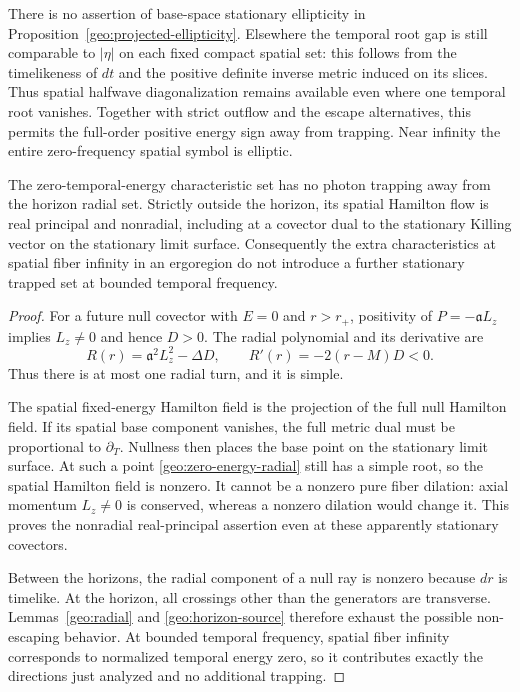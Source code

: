 There is no assertion of base-space stationary ellipticity in
Proposition~\ref{geo:projected-ellipticity}.  Elsewhere the temporal
root gap is still comparable to $|\eta|$ on each fixed compact
spatial set: this follows from the timelikeness of $dt$ and the
positive definite inverse metric induced on its slices.  Thus
spatial halfwave diagonalization remains available even where one
temporal root vanishes.  Together with strict outflow and the
escape alternatives, this permits the full-order positive energy
sign away from trapping.  Near infinity the entire zero-frequency
spatial symbol is elliptic.

\begin{lemma}
\label{geo:zero-energy}
The zero-temporal-energy characteristic set has no photon trapping
away from the horizon radial set.  Strictly outside the horizon,
its spatial Hamilton flow is real principal and nonradial,
including at a covector dual to the stationary Killing vector on
the stationary limit surface.  Consequently the extra
characteristics at spatial fiber infinity in an ergoregion do not
introduce a further stationary trapped set at bounded temporal
frequency.
\end{lemma}

\begin{proof}
For a future null covector with $E=0$ and $r>r_+$, positivity
of $P=-\mathfrak a L_z$ implies $L_z\neq0$ and hence $D>0$.
The radial polynomial and its derivative are
\begin{equation}
 R(r)=\mathfrak a^2L_z^2-\Delta D,\qquad
 R'(r)=-2(r-M)D<0.
 \label{geo:zero-energy-radial}
\end{equation}
Thus there is at most one radial turn, and it is simple.

The spatial fixed-energy Hamilton field is the projection of the
full null Hamilton field.  If its spatial base component vanishes,
the full metric dual must be proportional to $\partial_T$.
Nullness then places the base point on the stationary limit
surface.  At such a point \eqref{geo:zero-energy-radial} still
has a simple root, so the spatial Hamilton field is nonzero.
It cannot be a nonzero pure fiber dilation: axial momentum
$L_z\neq0$ is conserved, whereas a nonzero dilation would change
it.  This proves the nonradial real-principal assertion even at
these apparently stationary covectors.

Between the horizons, the radial component of a null ray is
nonzero because $dr$ is timelike.  At the horizon, all crossings
other than the generators are transverse.  Lemmas~\ref{geo:radial}
and \ref{geo:horizon-source} therefore exhaust the possible
non-escaping behavior.  At bounded temporal frequency, spatial
fiber infinity corresponds to normalized temporal energy zero,
so it contributes exactly the directions just analyzed and no
additional trapping.
\end{proof}

